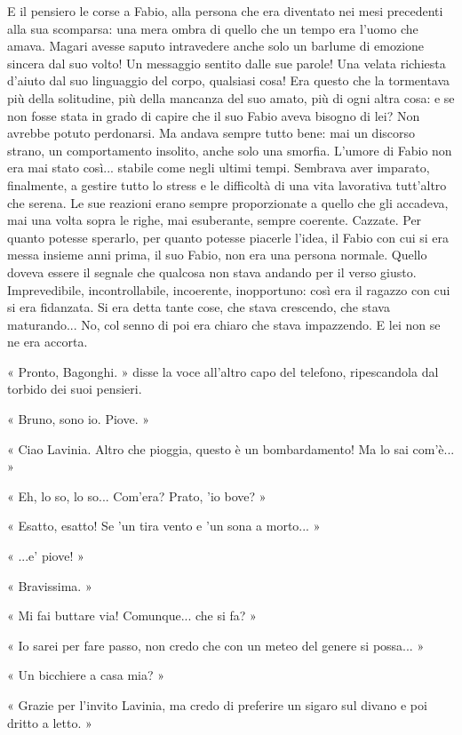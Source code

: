 E il pensiero le corse a Fabio, alla persona che era diventato nei mesi precedenti alla sua scomparsa: una mera ombra di quello che un tempo era l'uomo che amava. Magari avesse saputo intravedere anche solo un barlume di emozione sincera dal suo volto! Un messaggio sentito dalle sue parole! Una velata richiesta d'aiuto dal suo linguaggio del corpo, qualsiasi cosa! Era questo che la tormentava più della solitudine, più della mancanza del suo amato, più di ogni altra cosa: e se non fosse stata in grado di capire che il suo Fabio aveva bisogno di lei? Non avrebbe potuto perdonarsi. Ma andava sempre tutto bene: mai un discorso strano, un comportamento insolito, anche solo una smorfia. L'umore di Fabio non era mai stato così... stabile come negli ultimi tempi. Sembrava aver imparato, finalmente, a gestire tutto lo stress e le difficoltà di una vita lavorativa tutt'altro che serena. Le sue reazioni erano sempre proporzionate a quello che gli accadeva, mai una volta sopra le righe, mai esuberante, sempre coerente. Cazzate. Per quanto potesse sperarlo, per quanto potesse piacerle l'idea, il Fabio con cui si era messa insieme anni prima, il suo Fabio, non era una persona normale. Quello doveva essere il segnale che qualcosa non stava andando per il verso giusto. Imprevedibile, incontrollabile, incoerente, inopportuno: così era il ragazzo con cui si era fidanzata. Si era detta tante cose, che stava crescendo, che stava maturando... No, col senno di poi era chiaro che stava impazzendo. E lei non se ne era accorta.

« Pronto, Bagonghi. » disse la voce all'altro capo del telefono, ripescandola dal torbido dei suoi pensieri.

« Bruno, sono io. Piove. »

« Ciao Lavinia. Altro che pioggia, questo è un bombardamento! Ma lo sai com'è... »

« Eh, lo so, lo so... Com'era? Prato, 'io bove? »

« Esatto, esatto! Se 'un tira vento e 'un sona a morto... »

« ...e' piove! »

« Bravissima. »

« Mi fai buttare via! Comunque... che si fa? »

« Io sarei per fare passo, non credo che con un meteo del genere si possa... »

« Un bicchiere a casa mia? »

« Grazie per l'invito Lavinia, ma credo di preferire un sigaro sul divano e poi dritto a letto. »

